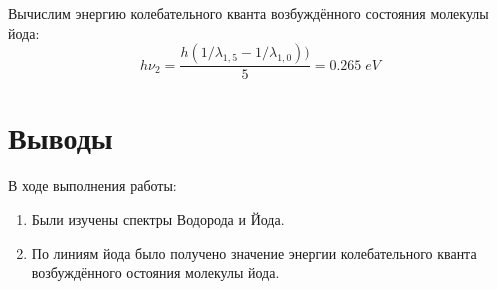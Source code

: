 \documentclass{article}
\begin{document}
Вычислим энергию колебательного кванта возбуждённого состояния молекулы йода:
\[ h\nu_2 = \frac{h(1/\lambda_{1,5} - 1/\lambda_{1,0}))}{5} = 0.265\; eV \]

\section{Выводы}
В ходе выполнения работы:
\begin{enumerate}
	\item Были изучены спектры Водорода и Йода.
	\item По линиям йода было получено значение энергии колебательного кванта
возбуждённого остояния молекулы йода.
\end{enumerate}
\end{document}
